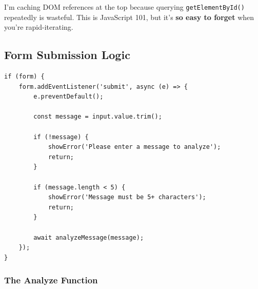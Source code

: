 \documentclass[12pt, a4paper]{article}
\begin{document}
\begin{devnote}
I'm caching DOM references at the top because querying \texttt{getElementById()} repeatedly is wasteful. This is JavaScript 101, but it's \textbf{so easy to forget} when you're rapid-iterating.
\end{devnote}

\subsection{Form Submission Logic}

\begin{verbatim}
if (form) {
    form.addEventListener('submit', async (e) => {
        e.preventDefault();
        
        const message = input.value.trim();
        
        if (!message) {
            showError('Please enter a message to analyze');
            return;
        }
        
        if (message.length < 5) {
            showError('Message must be 5+ characters');
            return;
        }
        
        await analyzeMessage(message);
    });
}
\end{verbatim}

\subsubsection{The Analyze Function}
\end{document}

